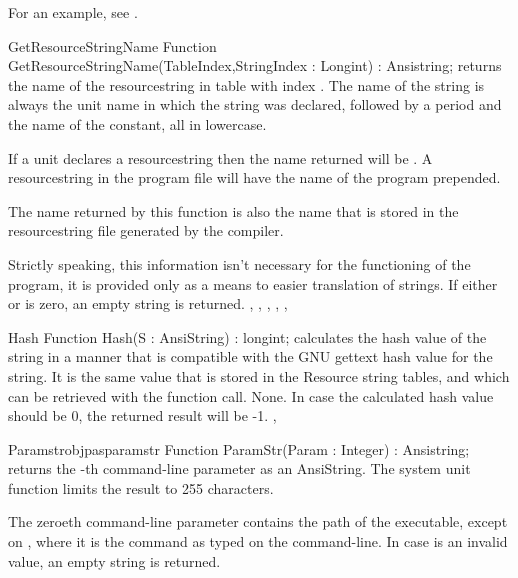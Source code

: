 \documentclass{report}
\begin{document}
For an example, see .

\begin{function}{GetResourceStringName}
\Declaration
Function GetResourceStringName(TableIndex,StringIndex : Longint) : Ansistring;
\Description
{} returns the name of the resourcestring in table
 with index . The name of the string is
always the unit name in which the string was declared, followed by a period
and the name of the constant, all in lowercase.

If a unit  declares a resourcestring  then the
name returned will be . A resourcestring in the program file
will have the name of the program prepended.

The name returned by this function is also the name that is stored in the 
resourcestring file generated by the compiler. 

Strictly speaking, this information isn't necessary for the functioning
of the program, it is provided only as a means to easier translation of 
strings.
\Errors
If either  or  is zero, an empty string
is returned.
\SeeAlso
{},
,
,
,
,
\end{function}



\begin{function}{Hash}
\Declaration
Function Hash(S : AnsiString) : longint;
\Description
{} calculates the hash value of the string  in a manner that 
is compatible with the GNU gettext hash value for the string. It is the same
value that is stored in the Resource string tables, and which can be
retrieved with the  function call.
\Errors
 None. In case the calculated hash value should be 0, the returned result 
will be -1.
\SeeAlso
{},
\end{function}


\begin{functionl}{Paramstr}{objpasparamstr}
\Declaration
Function ParamStr(Param : Integer) : Ansistring;
\Description
{} returns the -th command-line parameter as an 
AnsiString. The system unit  function limits the result to
255 characters.

The zeroeth command-line parameter contains the path of the executable,
except on \linux, where it is the command as typed on the command-line.
\Errors
In case  is an invalid value, an empty string is returned.
\SeeAlso
{}
\end{functionl}
\end{document}
